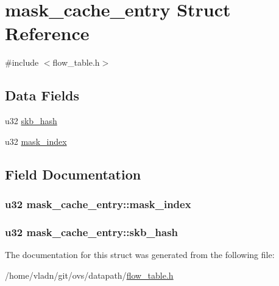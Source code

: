 \hypertarget{structmask__cache__entry}{}\section{mask\+\_\+cache\+\_\+entry Struct Reference}
\label{structmask__cache__entry}


{\ttfamily \#include $<$flow\+\_\+table.\+h$>$}

\subsection*{Data Fields}
\begin{DoxyCompactItemize}
\item 
u32 \hyperlink{structmask__cache__entry_a45ae5222badf95e1c919a0d6d0090b6f}{skb\+\_\+hash}
\item 
u32 \hyperlink{structmask__cache__entry_a87faeaec562bcab421cb208dfc0ef5f0}{mask\+\_\+index}
\end{DoxyCompactItemize}


\subsection{Field Documentation}
\hypertarget{structmask__cache__entry_a87faeaec562bcab421cb208dfc0ef5f0}{}
\subsubsection[{mask\+\_\+index}]{\setlength{\rightskip}{0pt plus 5cm}u32 mask\+\_\+cache\+\_\+entry\+::mask\+\_\+index}\label{structmask__cache__entry_a87faeaec562bcab421cb208dfc0ef5f0}
\hypertarget{structmask__cache__entry_a45ae5222badf95e1c919a0d6d0090b6f}{}
\subsubsection[{skb\+\_\+hash}]{\setlength{\rightskip}{0pt plus 5cm}u32 mask\+\_\+cache\+\_\+entry\+::skb\+\_\+hash}\label{structmask__cache__entry_a45ae5222badf95e1c919a0d6d0090b6f}


The documentation for this struct was generated from the following file\+:\begin{DoxyCompactItemize}
\item 
/home/vladn/git/ovs/datapath/\hyperlink{flow__table_8h}{flow\+\_\+table.\+h}\end{DoxyCompactItemize}
